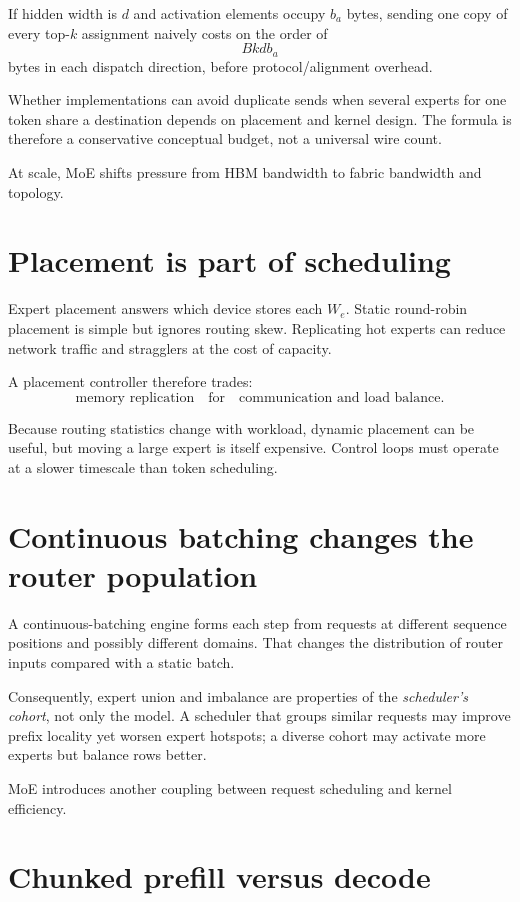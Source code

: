 If hidden width is $d$ and activation elements occupy $b_a$ bytes, sending one copy of
every top-$k$ assignment naively costs on the order of
\[
Bk d b_a
\]
bytes in each dispatch direction, before protocol/alignment overhead.

Whether implementations can avoid duplicate sends when several experts for one token
share a destination depends on placement and kernel design. The formula is therefore a
conservative conceptual budget, not a universal wire count.

At scale, MoE shifts pressure from HBM bandwidth to fabric bandwidth and topology.

\section{Placement is part of scheduling}

Expert placement answers which device stores each $W_e$. Static round-robin placement
is simple but ignores routing skew. Replicating hot experts can reduce network traffic
and stragglers at the cost of capacity.

A placement controller therefore trades:
\[
\text{memory replication}
\quad\text{for}\quad
\text{communication and load balance}.
\]

Because routing statistics change with workload, dynamic placement can be useful, but
moving a large expert is itself expensive. Control loops must operate at a slower
timescale than token scheduling.

\section{Continuous batching changes the router population}

A continuous-batching engine forms each step from requests at different sequence
positions and possibly different domains. That changes the distribution of router
inputs compared with a static batch.

Consequently, expert union and imbalance are properties of the \emph{scheduler's
cohort}, not only the model. A scheduler that groups similar requests may improve
prefix locality yet worsen expert hotspots; a diverse cohort may activate more experts
but balance rows better.

MoE introduces another coupling between request scheduling and kernel efficiency.

\section{Chunked prefill versus decode}

